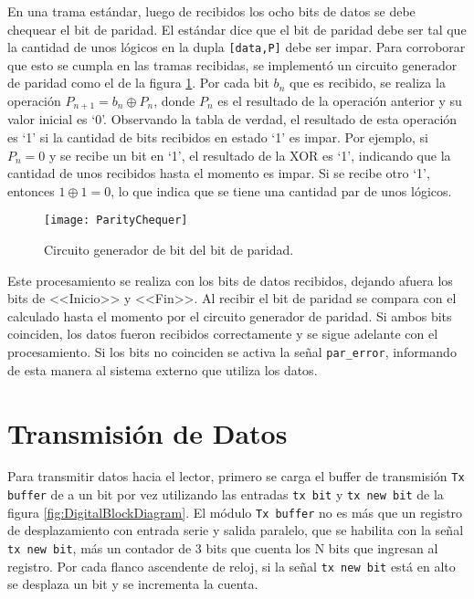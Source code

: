 En una trama estándar, luego de recibidos los ocho bits de datos se 
debe chequear el bit de paridad. El estándar dice que el bit de 
paridad debe ser tal que la cantidad de unos lógicos en la dupla 
\lstinline{[data,P]} debe ser impar. Para corroborar que esto se 
cumpla en las tramas recibidas, se implementó un circuito generador 
de paridad como el de la figura \ref{fig:ParityChequer}. Por cada 
bit \(b_{n}\) que es recibido, se realiza la operación \(P_{n+1} = 
b_{n} \oplus P_{n}\), donde \(P_{n}\) es el resultado de la 
operación anterior y su valor inicial es `0'. Observando la tabla de 
verdad, el resultado de esta operación es `1' si la cantidad de bits 
recibidos en estado `1' es impar. Por ejemplo, si \(P_{n}=0\) y se 
recibe un bit en `1', el resultado de la XOR es `1', indicando que 
la cantidad de unos recibidos hasta el momento es impar. Si se 
recibe otro `1', entonces \(1 \oplus 1 = 0\), lo que indica que se 
tiene una cantidad par de unos lógicos.

\begin{figure}
	\centering
	\texttt{[image: ParityChequer]}
	\caption{Circuito generador de bit del bit de paridad.}
	\label{fig:ParityChequer}
\end{figure}

Este procesamiento se realiza con los bits de datos recibidos, dejando 
afuera los bits de <<Inicio>> y <<Fin>>. Al recibir el bit de paridad 
se compara con el calculado hasta el momento por el circuito generador 
de paridad. Si ambos bits coinciden, los datos fueron recibidos 
correctamente y se sigue adelante con el procesamiento. Si los bits no 
coinciden se activa la señal \lstinline{par_error}, informando de esta 
manera al sistema externo que utiliza los datos.


\section{Transmisión de Datos}

Para transmitir datos hacia el lector, primero se carga el buffer de 
transmisión \lstinline{Tx buffer} de a un bit por vez utilizando las 
entradas \lstinline{tx bit} y \lstinline{tx new bit} de la figura 
\ref{fig:DigitalBlockDiagram}. El módulo \lstinline{Tx buffer} no es 
más que un registro de desplazamiento con entrada serie y salida 
paralelo, que se habilita con la señal \lstinline{tx new bit}, más 
un contador de 3 bits que cuenta los N bits que ingresan al registro. 
Por cada flanco ascendente de reloj, si la señal \lstinline{tx new bit} 
está en alto se desplaza un bit y se incrementa la cuenta.


